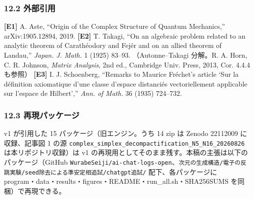 \documentclass[
  10pt,
  a4paper,
]{ltjsarticle}
\begin{document}
\subsubsection{12.2 外部引用}\label{ux5916ux90e8ux5f15ux7528}

\textbf{{[}E1{]}} A. Aste, ``Origin of the Complex Structure of Quantum
Mechanics,'' arXiv:1905.12894, 2019. \textbf{{[}E2{]}} T. Takagi, ``On
an algebraic problem related to an analytic theorem of Carathéodory and
Fejér and on an allied theorem of Landau,'' \emph{Japan. J. Math.} 1
(1925) 83--93. （Autonne--Takagi 分解。R. A. Horn, C. R. Johnson,
\emph{Matrix Analysis}, 2nd ed., Cambridge Univ. Press, 2013, Cor. 4.4.4
も参照） \textbf{{[}E3{]}} I. J. Schoenberg, ``Remarks to Maurice
Fréchet's article `Sur la définition axiomatique d'une classe d'espace
distanciés vectoriellement applicable sur l'espace de Hilbert',''
\emph{Ann. of Math.} 36 (1935) 724--732.

\subsubsection{12.3
再現パッケージ}\label{ux518dux73feux30d1ux30c3ux30b1ux30fcux30b8}

v1 が引用した 15 パッケージ（旧エンジン。うち 14 zip は Zenodo 22112009
に収録、記事図 1 の源
\texttt{complex\_simplex\_decompactification\_N5\_N16\_20260826}
は本リポジトリ収録）は v1
の再現用としてそのまま残す。本稿の主張は以下のパッケージ（GitHub
\texttt{WurabeSeiji/ai-chat-logs-open}、\texttt{次元の生成構造/電子の反跳実験/seed除去による準安定相追試/chatgpt追試/}
配下、各パッケージに
program・data・results・figures・README・run\_all.sh・SHA256SUMS
を同梱）で再現できる。
\end{document}
